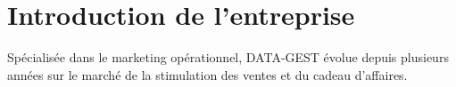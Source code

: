 \section{Introduction de l'entreprise}
\justifying

Spécialisée dans le marketing opérationnel, DATA-GEST évolue depuis plusieurs années sur le marché de la stimulation des ventes et du cadeau d’affaires.\\[2ex]



